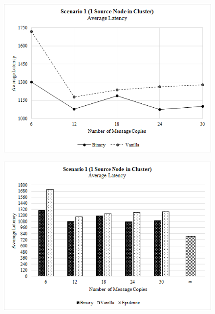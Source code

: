 \documentclass{article}
\begin{document}
\begin{figure}[h!]
\centering
\begin{minipage}[t]{.5\textwidth}
  \centering
  \includegraphics[width=.98\linewidth]{Results/Graphs/AverageLatency/S1_AverageLatency_SprayAndWaitComparison.png}
  \label{fig:test1}
\end{minipage}%
\begin{minipage}[t]{.5\textwidth}
  \centering
  \includegraphics[width=.98\linewidth]{Results/Graphs/AverageLatency/S1_AverageLatency_AllComparison.png}
  \label{fig:test2}
\end{minipage}


\end{figure}
\end{document}
